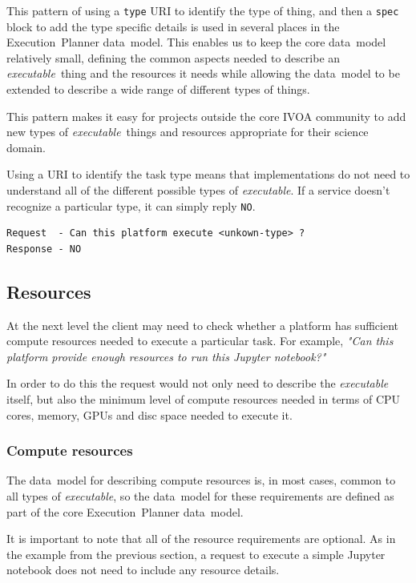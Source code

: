 \documentclass[11pt,a4paper]{ivoa}
\newcommand{\datamodel} {data~model}
\newcommand{\ivoa} {IVOA}
\newcommand{\executionplanner} {Execution~Planner}
\newcommand{\jupyternotebook} {Jupyter notebook}
\newcommand{\codeword}[1] {\texttt{#1}}
\newcommand{\executable} {\textit{executable}}
\newcommand{\executablething} {\textit{executable}~thing}
\newcommand{\cpu} {CPU}
\newcommand{\gpu} {GPU}
\begin{document}
This pattern of using a \codeword{type} URI to identify the type of thing, and then a
\codeword{spec} block to add the type specific details is used in several places in the
\executionplanner{} \datamodel{}.
This enables us to keep the core \datamodel{} relatively small, defining the common aspects
needed to describe an \executablething{} and the resources it needs while allowing the
\datamodel{} to be extended to describe a wide range of different types of things.

This pattern makes it easy for projects outside the core \ivoa{} community to add new
types of \executablething{}s and resources appropriate for their science domain.

Using a URI to identify the task type means that implementations do not need to understand
all of the different possible types of \executable{}.
If a service doesn’t recognize a particular type, it can simply reply \codeword{NO}.

\begin{lstlisting}[]
Request  - Can this platform execute <unkown-type> ?
Response - NO
\end{lstlisting}

\subsection{Resources}
\label{resources}

At the next level the client may need to check whether a platform has sufficient compute resources
needed to execute a particular task.
For example, \textit{"Can this platform provide enough resources to run this \jupyternotebook{}?"}

In order to do this the request would not only need to describe the \executable{} itself,
but also the minimum level of compute resources needed in terms of \cpu{} cores, memory, \gpu{}s
and disc space needed to execute it.

\subsubsection{Compute resources}
\label{compute-resources}

The \datamodel{} for describing compute resources is, in most cases, common to all types of \executable{},
so the \datamodel{} for these requirements are defined as part of the core \executionplanner{} \datamodel{}.

It is important to note that all of the resource requirements are optional.
As in the example from the previous section, a request to execute a simple \jupyternotebook{}
does not need to include any resource details.
\end{document}
